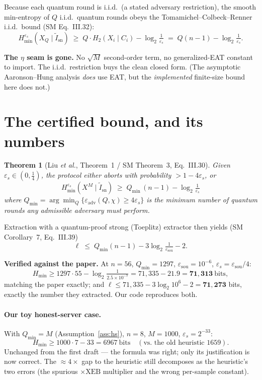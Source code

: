 \documentclass[11pt]{article}
\theoremstyle{definition}
\theoremstyle{plain}
\newtheorem{theorem}{Theorem}
\newcommand{\Fxeb}{\mathrm{XEB}}
\newcommand{\Hmin}{H_{\min}}
\newcommand{\epss}{\varepsilon_{s}}
\newcommand{\epssou}{\varepsilon_{\mathrm{sou}}}
\newcommand{\Qmin}{Q_{\min}}
\begin{document}
Because each quantum round is i.i.d.\ (a stated adversary restriction), the smooth min-entropy of
$Q$ i.i.d.\ quantum rounds obeys the Tomamichel--Colbeck--Renner i.i.d.\ bound (SM Eq.~III.32):
\[
\Hmin^{\epss}(X_Q \mid \tilde I_{\mathrm{sn}})
\;\ge\; Q\cdot H_2(X_i\mid C_i) - \log_2\!\tfrac{1}{\epss}
\;=\; Q(n-1) - \log_2\!\tfrac{1}{\epss}.
\]

\begin{okbox}
\textbf{The $\eta$ seam is gone.} No $\sqrt{M}$ second-order term, no generalized-EAT constant to
import. The i.i.d.\ restriction buys the clean closed form. (The asymptotic Aaronson--Hung analysis
\emph{does} use EAT, but the \emph{implemented} finite-size bound here does not.)
\end{okbox}

\section{The certified bound, and its numbers}

\begin{theorem}[Liu \emph{et al.}, Theorem~1 / SM Theorem~3, Eq.~III.30]\label{thm:main}
Given $\epss\in(0,\tfrac14)$, the protocol either aborts with probability $>1-4\epss$, or
\[
\boxed{\;\Hmin^{\epss}(X^M \mid \tilde I_{\mathrm{sn}}) \;\ge\; \Qmin\,(n-1) - \log_2\!\tfrac{1}{\epss}\;}
\]
where $\Qmin=\arg\min_Q\{\varepsilon_{\mathrm{adv}}(Q,\chi)\ge 4\epss\}$ is the minimum number of
quantum rounds any admissible adversary must perform.
\end{theorem}

\noindent Extraction with a quantum-proof strong (Toeplitz) extractor then yields (SM Corollary~7,
Eq.~III.39)
\[
\ell \;\le\; \Qmin(n-1) - 3\log_2\!\tfrac{1}{\epssou} - 2 .
\]

\begin{okbox}
\textbf{Verified against the paper.} At $n=56$, $\Qmin=1297$, $\epssou=10^{-6}$, $\epss=\epssou/4$:
\[
\Hmin \ge 1297\cdot 55 - \log_2\tfrac{1}{2.5\times10^{-7}} = 71{,}335 - 21.9 = \mathbf{71{,}313}\ \text{bits},
\]
matching the paper exactly; and $\ell \le 71{,}335 - 3\log_2 10^{6} - 2 = \mathbf{71{,}273}$ bits,
exactly the number they extracted. Our code reproduces both.
\end{okbox}

\paragraph{Our toy honest-server case.} With $\Qmin=M$ (Assumption~\ref{ass:hs}), $n=8$, $M=1000$,
$\epss=2^{-33}$:
\[
\Hmin \ge 1000\cdot 7 - 33 = 6967\ \text{bits} \quad(\text{vs.\ the old heuristic }1659).
\]
Unchanged from the first draft --- the formula was right; only its justification is now correct.
The $\approx4\times$ gap to the heuristic still decomposes as the heuristic's two errors (the
spurious $\times\Fxeb$ multiplier and the wrong per-sample constant).
\end{document}
